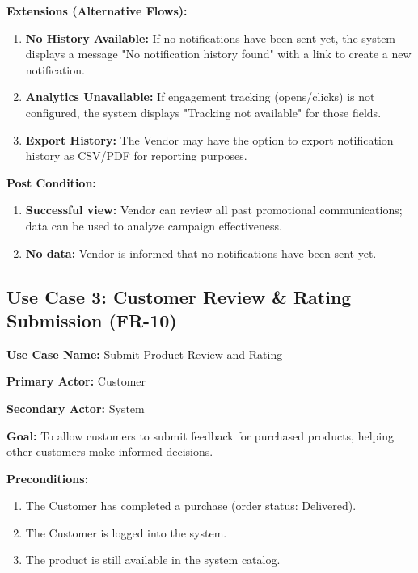 \textbf{Extensions (Alternative Flows):}
\begin{enumerate}
    \item[2a.] \textbf{No History Available:} If no notifications have been sent yet, the system displays a message "No notification history found" with a link to create a new notification.
    \item[3a.] \textbf{Analytics Unavailable:} If engagement tracking (opens/clicks) is not configured, the system displays "Tracking not available" for those fields.
    \item[5a.] \textbf{Export History:} The Vendor may have the option to export notification history as CSV/PDF for reporting purposes.
\end{enumerate}

\textbf{Post Condition:}
\begin{enumerate}
    \item \textbf{Successful view:} Vendor can review all past promotional communications; data can be used to analyze campaign effectiveness.
    \item \textbf{No data:} Vendor is informed that no notifications have been sent yet.
\end{enumerate}

\subsection*{Use Case 3: Customer Review \& Rating Submission (FR-10)}

\textbf{Use Case Name:} Submit Product Review and Rating

\textbf{Primary Actor:} Customer

\textbf{Secondary Actor:} System

\textbf{Goal:} To allow customers to submit feedback for purchased products, helping other customers make informed decisions.

\textbf{Preconditions:}
\begin{enumerate}
    \item The Customer has completed a purchase (order status: Delivered).
    \item The Customer is logged into the system.
    \item The product is still available in the system catalog.
\end{enumerate}

